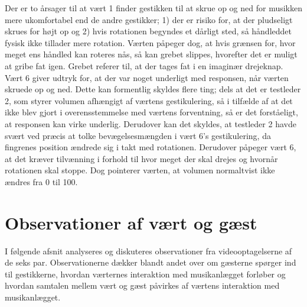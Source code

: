 Der er to årsager til at vært 1 finder gestikken til at skrue op og ned for musikken mere ukomfortabel end de andre gestikker; 1) der er risiko for, at der pludseligt skrues for højt op og 2) hvis rotationen begyndes et dårligt sted, så håndleddet fysisk ikke tillader mere rotation. Værten påpeger dog, at hvis grænsen for, hvor meget ens håndled kan roteres nås, så kan grebet slippes, hvorefter det er muligt at gribe fat igen. Grebet referer til, at der tages fat i en imaginær drejeknap. Vært 6 giver udtryk for, at der var noget underligt med responsen, når værten skruede op og ned. Dette kan formentlig skyldes flere ting; dels at det er testleder 2, som styrer volumen afhængigt af værtens gestikulering, så i tilfælde af at det ikke blev gjort i overensstemmelse med værtens forventning, så er det forståeligt, at responsen kan virke underlig. Derudover kan det skyldes, at testleder 2 havde svært ved præcis at tolke bevægelsesmængden i vært 6's gestikulering, da fingrenes position ændrede sig i takt med rotationen. Derudover påpeger vært 6, at det kræver tilvænning i forhold til hvor meget der skal drejes og hvornår rotationen skal stoppe. Dog pointerer værten, at volumen normaltvist ikke ændres fra 0 til 100. 
%
\section{Observationer af vært og gæst}
\label{TestresultaterSocialAcceptGestikkerObservationer}
%
I følgende afsnit analyseres og diskuteres observationer fra videooptagelserne af de seks par. Observationerne dækker blandt andet over om gæsterne spørger ind til gestikkerne, hvordan værternes interaktion med musikanlægget forløber og hvordan samtalen mellem vært og gæst påvirkes af værtens interaktion med musikanlægget.
%
